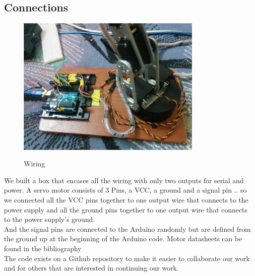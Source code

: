 \documentclass[11pt,a4paper]{report}
\begin{document}
\subsection{Connections}
\begin{figure}[h]
\centering
{\includegraphics[width=0.8\textwidth]{Figures/Wire.jpg}}
\caption{Wiring}
\label{fig:wire}
\end{figure}
We built a box that encases all the wiring with only two outputs for serial and power. A servo motor consists of 3 Pins, a VCC, a ground and a signal pin .. so we connected all the VCC pins together to one output wire that connects to the power supply and all the ground pins together to one output wire that connects to the power supply's ground.\\
And the signal pins are connected to the Arduino randomly but are defined from the ground up at the beginning of the Arduino code. Motor datasheets can be found in the bibliography \cite{datasheet1} \cite{datasheet2}\\
The code exists on a Github repository \cite{github} to make it easier to collaborate our work and for others that are interested in continuing our work. 
\end{document}
